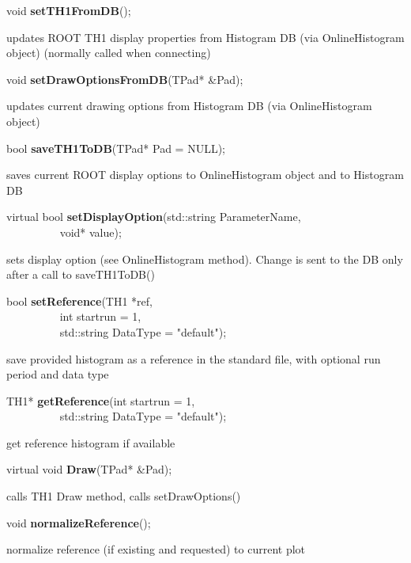 \item    void {\bf setTH1FromDB}();


 updates ROOT TH1 display properties from Histogram DB (via OnlineHistogram object) 
 (normally called when connecting)


\item    void {\bf setDrawOptionsFromDB}(TPad* \&Pad);


 updates current drawing options from Histogram DB (via OnlineHistogram object)


\item    bool {\bf saveTH1ToDB}(TPad* Pad = NULL);


 saves current ROOT display options to OnlineHistogram object and to Histogram DB


\item    virtual bool {\bf setDisplayOption}(std::string ParameterName,\\\mbox{}~~~~~~~~~ 
				void* value);

 sets display option (see OnlineHistogram method). Change is sent to the DB only 
 after a call to saveTH1ToDB()


\item    bool {\bf setReference}(TH1 *ref,\\\mbox{}~~~~~~~~~
		    int startrun = 1,\\\mbox{}~~~~~~~~~
		    std::string DataType = "default");

 save provided histogram as a reference in the standard file, with optional run period and data type


\item    TH1* {\bf getReference}(int startrun = 1,\\\mbox{}~~~~~~~~~
		    std::string DataType = "default");

 get reference histogram if available


\item    virtual void {\bf Draw}(TPad* \&Pad);


 calls TH1 Draw method, calls setDrawOptions()


\item    void {\bf normalizeReference}();


 normalize reference (if existing and requested) to current plot


